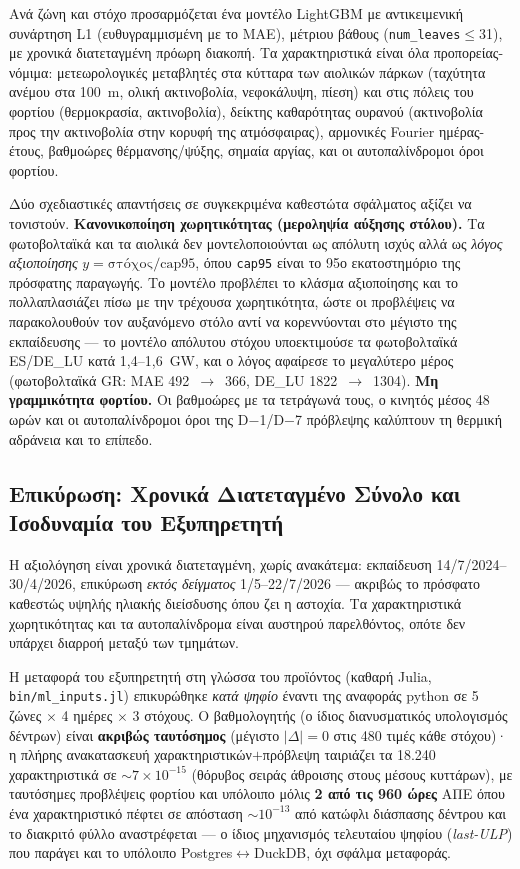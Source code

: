 Ανά ζώνη και στόχο προσαρμόζεται ένα μοντέλο LightGBM με αντικειμενική συνάρτηση L1 (ευθυγραμμισμένη με το MAE), μέτριου βάθους (\texttt{num\_leaves}$\le$31), με χρονικά διατεταγμένη πρόωρη διακοπή. Τα χαρακτηριστικά είναι όλα προπορείας-νόμιμα: μετεωρολογικές μεταβλητές στα κύτταρα των αιολικών πάρκων (ταχύτητα ανέμου στα 100~m, ολική ακτινοβολία, νεφοκάλυψη, πίεση) και στις πόλεις του φορτίου (θερμοκρασία, ακτινοβολία), δείκτης καθαρότητας ουρανού (ακτινοβολία προς την ακτινοβολία στην κορυφή της ατμόσφαιρας), αρμονικές Fourier ημέρας-έτους, βαθμοώρες θέρμανσης/ψύξης, σημαία αργίας, και οι αυτοπαλίνδρομοι όροι φορτίου.

Δύο σχεδιαστικές απαντήσεις σε συγκεκριμένα καθεστώτα σφάλματος αξίζει να τονιστούν. \textbf{Κανονικοποίηση χωρητικότητας (μεροληψία αύξησης στόλου).} Τα φωτοβολταϊκά και τα αιολικά δεν μοντελοποιούνται ως απόλυτη ισχύς αλλά ως \emph{λόγος αξιοποίησης} $y = \text{στόχος}/\text{cap95}$, όπου \texttt{cap95} είναι το 95ο εκατοστημόριο της πρόσφατης παραγωγής. Το μοντέλο προβλέπει το κλάσμα αξιοποίησης και το πολλαπλασιάζει πίσω με την τρέχουσα χωρητικότητα, ώστε οι προβλέψεις να παρακολουθούν τον αυξανόμενο στόλο αντί να κορεννύονται στο μέγιστο της εκπαίδευσης --- το μοντέλο απόλυτου στόχου υποεκτιμούσε τα φωτοβολταϊκά ES/DE\_LU κατά 1,4--1,6~GW, και ο λόγος αφαίρεσε το μεγαλύτερο μέρος (φωτοβολταϊκά GR: MAE 492~$\to$~366, DE\_LU 1822~$\to$~1304). \textbf{Μη γραμμικότητα φορτίου.} Οι βαθμοώρες με τα τετράγωνά τους, ο κινητός μέσος 48 ωρών και οι αυτοπαλίνδρομοι όροι της D$-$1/D$-$7 πρόβλεψης καλύπτουν τη θερμική αδράνεια και το επίπεδο.

\subsection{Επικύρωση: Χρονικά Διατεταγμένο Σύνολο και Ισοδυναμία του Εξυπηρετητή}
\label{subsec:input-validation}

Η αξιολόγηση είναι χρονικά διατεταγμένη, χωρίς ανακάτεμα: εκπαίδευση 14/7/2024--30/4/2026, επικύρωση \emph{εκτός δείγματος} 1/5--22/7/2026 --- ακριβώς το πρόσφατο καθεστώς υψηλής ηλιακής διείσδυσης όπου ζει η αστοχία. Τα χαρακτηριστικά χωρητικότητας και τα αυτοπαλίνδρομα είναι αυστηρού παρελθόντος, οπότε δεν υπάρχει διαρροή μεταξύ των τμημάτων.

Η μεταφορά του εξυπηρετητή στη γλώσσα του προϊόντος (καθαρή Julia, \texttt{bin/ml\_inputs.jl}) επικυρώθηκε \emph{κατά ψηφίο} έναντι της αναφοράς python σε 5 ζώνες $\times$ 4 ημέρες $\times$ 3 στόχους. Ο βαθμολογητής (ο ίδιος διανυσματικός υπολογισμός δέντρων) είναι \textbf{ακριβώς ταυτόσημος} (μέγιστο $|\Delta|=0$ στις 480 τιμές κάθε στόχου)· η πλήρης ανακατασκευή χαρακτηριστικών$+$πρόβλεψη ταιριάζει τα 18.240 χαρακτηριστικά σε $\sim 7\times 10^{-15}$ (θόρυβος σειράς άθροισης στους μέσους κυττάρων), με ταυτόσημες προβλέψεις φορτίου και υπόλοιπο μόλις \textbf{2 από τις 960 ώρες} ΑΠΕ όπου ένα χαρακτηριστικό πέφτει σε απόσταση $\sim 10^{-13}$ από κατώφλι διάσπασης δέντρου και το διακριτό φύλλο αναστρέφεται --- ο ίδιος μηχανισμός τελευταίου ψηφίου (\emph{last-ULP}) που παράγει και το υπόλοιπο Postgres$\leftrightarrow$DuckDB, όχι σφάλμα μεταφοράς.

